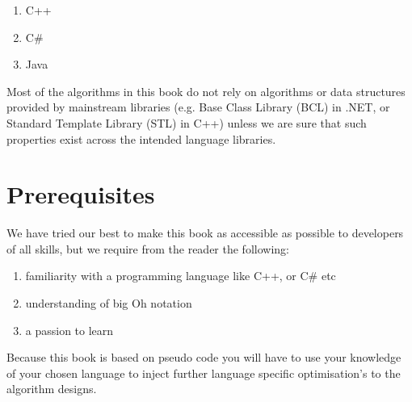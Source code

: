 \begin{enumerate}
\item C++
\item C\#
\item Java
\end{enumerate}

Most of the algorithms in this book do not rely on algorithms or data structures provided by mainstream libraries (e.g. Base Class Library (BCL) in .NET, or Standard Template Library (STL) in C++) unless we are sure that such properties exist across the intended language libraries.

\section*{Prerequisites}
We have tried our best to make this book as accessible as possible to developers of all skills, but we require from the reader the following:

\begin{enumerate}
\item familiarity with a programming language like C++, or C\# etc
\item understanding of big Oh notation
\item a passion to learn
\end{enumerate}

Because this book is based on pseudo code you will have to use your knowledge of your chosen language to inject further language specific optimisation's to the algorithm designs. 

